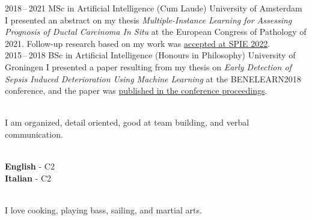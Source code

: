 \documentclass[9pt]{developercv}
\begin{document}
\begin{entrylist}
\entry
    {2018\,--\,2021}
    {MSc in Artificial Intelligence (Cum Laude)}
    {University of Amsterdam}
    {I presented an abstract on my thesis \emph{Multiple-Instance Learning for Assessing Prognosis of Ductal Carcinoma In Situ} at the European Congress of Pathology of 2021. Follow-up research based on my work was \href{https://doi.org/10.1117/12.2612838}{accepted at SPIE 2022}.\\
    }
\entry
    {2015\,--\,2018}
    {BSc in Artificial Intelligence (Honours in Philosophy)}
    {University of Groningen}
    {I presented a paper resulting from my thesis on \emph{Early Detection of Sepsis Induced Deterioration Using Machine Learning} at the BENELEARN2018 conference, and the paper was \href{https://doi.org/10.1007/978-3-030-31978-6_1}{published in the conference proceedings}.\\
    }
\end{entrylist}


\begin{minipage}[t]{0.45\textwidth}
    \vspace{-\baselineskip}
    \\
    I am organized, detail oriented, good at team building, and verbal communication.
\end{minipage}
\hfill
\begin{minipage}[t]{0.225\textwidth}
    \vspace{-\baselineskip}
    \\
    \textbf{English} - C2\\
    \textbf{Italian} - C2
\end{minipage}
\hfill
\begin{minipage}[t]{0.225\textwidth}
    \vspace{-\baselineskip}
    \\
    I love cooking, playing bass, sailing, and martial arts.
\end{minipage}
\end{document}
